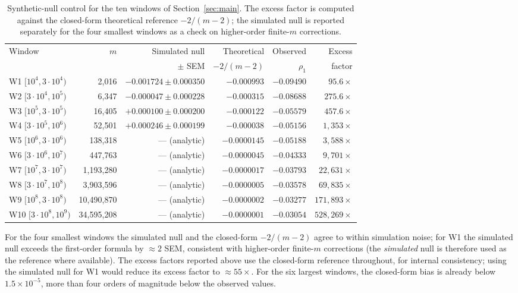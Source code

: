 \documentclass[11pt]{article}
\begin{document}
\begin{table}[H]\centering
\caption{Synthetic-null control for the ten windows of
Section~\ref{sec:main}. The excess factor is computed against the
closed-form theoretical reference $-2/(m-2)$; the simulated null is
reported separately for the four smallest windows as a check on
higher-order finite-$m$ corrections.}
\label{tab:C1}
\small
\begin{tabular}{lrrrrr}
\toprule
Window & $m$ & Simulated null & Theoretical & Observed & Excess \\
       &     & $\pm$ SEM      & $-2/(m-2)$  & $\rho_1$ & factor \\
\midrule
W1 $[10^4,3\cdot10^4)$       & 2,016      & $-0.001724 \pm 0.000350$ & $-0.000993$ & $-0.09490$ & $95.6\times$ \\
W2 $[3\cdot10^4,10^5)$       & 6,347      & $-0.000047 \pm 0.000228$ & $-0.000315$ & $-0.08688$ & $275.6\times$ \\
W3 $[10^5,3\cdot10^5)$       & 16,405     & $+0.000100 \pm 0.000200$ & $-0.000122$ & $-0.05579$ & $457.6\times$ \\
W4 $[3\cdot10^5,10^6)$       & 52,501     & $+0.000246 \pm 0.000199$ & $-0.000038$ & $-0.05156$ & $1{,}353\times$ \\
W5 $[10^6,3\cdot10^6)$       & 138,318    & --- (analytic)           & $-0.0000145$ & $-0.05188$ & $3{,}588\times$ \\
W6 $[3\cdot10^6,10^7)$       & 447,763    & --- (analytic)           & $-0.0000045$ & $-0.04333$ & $9{,}701\times$ \\
W7 $[10^7,3\cdot10^7)$       & 1,193,280  & --- (analytic)           & $-0.0000017$ & $-0.03793$ & $22{,}631\times$ \\
W8 $[3\cdot10^7,10^8)$       & 3,903,596  & --- (analytic)           & $-0.0000005$ & $-0.03578$ & $69{,}835\times$ \\
W9 $[10^8,3\cdot10^8)$       & 10,490,870 & --- (analytic)           & $-0.0000002$ & $-0.03277$ & $171{,}893\times$ \\
W10 $[3\cdot10^8,10^9)$      & 34,595,208 & --- (analytic)           & $-0.0000001$ & $-0.03054$ & $528{,}269\times$ \\
\bottomrule
\end{tabular}
\end{table}

For the four smallest windows the simulated null and the closed-form
$-2/(m-2)$ agree to within simulation noise; for W1 the simulated
null exceeds the first-order formula by $\approx 2$ SEM, consistent
with higher-order finite-$m$ corrections (the \emph{simulated} null is
therefore used as the reference where available). The excess factors
reported above use the closed-form reference throughout, for internal
consistency; using the simulated null for W1 would reduce its excess
factor to $\approx 55\times$. For the six largest windows, the
closed-form bias is already below $1.5 \times 10^{-5}$, more than four
orders of magnitude below the observed values.
\end{document}
